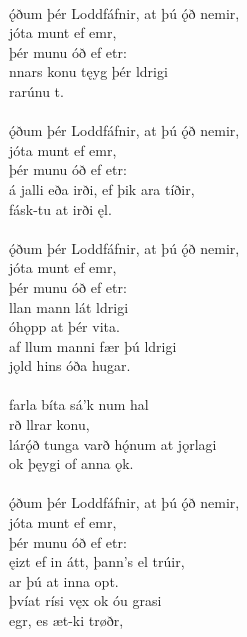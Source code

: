  \\

\bva {}ǫ́ðum þér Loddfáfnir, \hld at þú ǫ́ð nemir, \\%
\ind {}jóta munt ef emr, \\%
\ind þér munu óð ef etr: \\%
nnars konu \hld tęyg þér ldrigi \\%
\ind {}rarúnu t.\\%

 \\

\bva {}ǫ́ðum þér Loddfáfnir, \hld at þú ǫ́ð nemir, \\%
\ind {}jóta munt ef emr, \\%
\ind þér munu óð ef etr: \\%
á jalli eða irði, \hld ef þik ara tíðir, \\%
\ind fásk-tu at irði ęl.\\%

 \\

\bva {}ǫ́ðum þér Loddfáfnir, \hld at þú ǫ́ð nemir, \\%
\ind {}jóta munt ef emr, \\%
\ind þér munu óð ef etr: \\%
llan mann \hld lát ldrigi \\%
\ind óhǫpp at þér vita. \\%
af llum manni \hld fær þú ldrigi \\%
\ind {}jǫld hins óða hugar.\\%

 \\

\bva {}farla bíta \hld sá'k num hal \\%
\ind {}rð llrar konu, \\%
lárǫ́ð tunga \hld varð hǫ́num at jǫrlagi \\%
\ind ok þęygi of anna ǫk.\\%

 \\

\bva {}ǫ́ðum þér Loddfáfnir, \hld at þú ǫ́ð nemir, \\%
\ind {}jóta munt ef emr, \\%
\ind þér munu óð ef etr: \\%
ęizt ef in átt, \hld þann's el trúir, \\%
\ind {}ar þú at inna opt. \\%
þvíat rísi vęx \hld ok óu grasi \\%
\ind {}egr, es æt-ki trøðr,\\%

